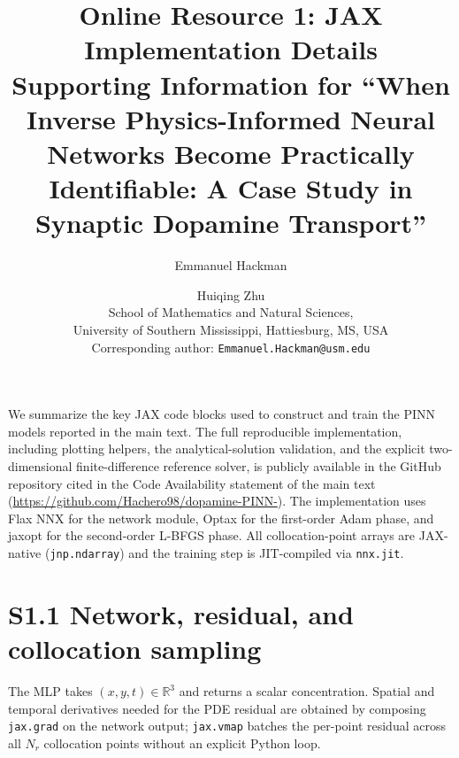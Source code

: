 \documentclass[12pt]{article}
\title{Online Resource 1: JAX Implementation Details \\
\large Supporting Information for ``When Inverse
Physics-Informed Neural Networks Become Practically
Identifiable: A Case Study in Synaptic Dopamine Transport''}
\author{Emmanuel Hackman \and Huiqing Zhu \\
School of Mathematics and Natural Sciences, \\
University of Southern Mississippi, Hattiesburg, MS, USA \\
Corresponding author: \texttt{Emmanuel.Hackman@usm.edu}}
\date{}
\begin{document}
\maketitle

We summarize the key JAX code blocks used to construct and train
the PINN models reported in the main text. The full reproducible
implementation, including plotting helpers, the analytical-solution
validation, and the explicit two-dimensional finite-difference
reference solver, is publicly available in the GitHub repository
cited in the Code Availability statement of the main text
(\url{https://github.com/Hachero98/dopamine-PINN-}). The
implementation uses Flax NNX for the network module, Optax for
the first-order Adam phase, and jaxopt for the second-order L-BFGS
phase. All collocation-point arrays are JAX-native
(\texttt{jnp.ndarray}) and the training step is JIT-compiled via
\texttt{nnx.jit}.

\section*{S1.1 Network, residual, and collocation sampling}

The MLP takes $(x, y, t) \in \mathbb{R}^3$ and returns a scalar
concentration. Spatial and temporal derivatives needed for the
PDE residual are obtained by composing \texttt{jax.grad} on the
network output; \texttt{jax.vmap} batches the per-point residual
across all $N_r$ collocation points without an explicit Python
loop.
\end{document}
